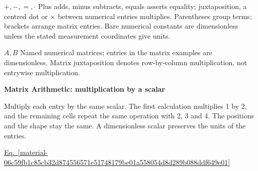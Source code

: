\documentclass[11pt,a4paper]{article}
\begin{document}
\begin{minipage}{\linewidth}
\par\noindent\textbf{\(+,-,=,\cdot\)} Plus adds, minus subtracts, equals asserts equality; juxtaposition, a centred dot or \ensuremath{\times} between numerical entries multiplies. Parentheses group terms; brackets arrange matrix entries. Bare numerical constants are dimensionless unless the stated measurement coordinates give units.

\par\noindent\textbf{\(A,B\)} Named numerical matrices; entries in the matrix examples are dimensionless. Matrix juxtaposition denotes row-by-column multiplication, not entrywise multiplication.

\end{minipage}\par
\medskip

\textbf{Matrix Arithmetic: multiplication by a scalar}


Multiply each entry by the same scalar. The first calculation multiplies 1 by 2, and the remaining cells repeat the same operation with 2, 3 and 4. The positions and the shape stay the same. A dimensionless scalar preserves the units of the entries.


\hyperref[material-06c59fb1c85cb32d874556571e51748179be01a558054d8d289b088ddf649e01]{Eq.~\ref*{material-06c59fb1c85cb32d874556571e51748179be01a558054d8d289b088ddf649e01}}
\end{document}
